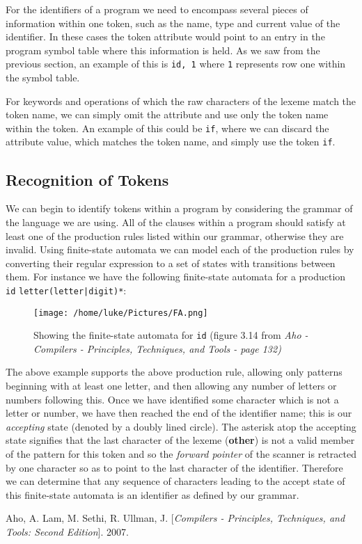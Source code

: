 \documentclass[a4paper, 11pt]{article}
\begin{document}
For the identifiers of a program we need to encompass several pieces of information within one token, such as the name, type and current value of the identifier. In these cases the token attribute would point to an entry in the program symbol table where this information is held. As we saw from the previous section, an example of this is \textlangle{}\texttt{id, 1}\textrangle{} where \texttt{1} represents row one within the symbol table.

For keywords and operations of which the raw characters of the lexeme match the token name, we can simply omit the attribute and use only the token name within the token. An example of this could be \texttt{if}, where we can discard the attribute value, which matches the token name, and simply use the token \textlangle{}\texttt{if}\textrangle{}.

\subsection{Recognition of Tokens}
We can begin to identify tokens within a program by considering the grammar of the language we are using. All of the clauses within a program should satisfy at least one of the production rules listed within our grammar, otherwise they are invalid. Using finite-state automata we can model each of the production rules by converting their regular expression to a set of states with transitions between them. For instance we have the following finite-state automata for a production \texttt{id} \textbf{\textrightarrow} \texttt{letter(letter|digit)*}:

\begin{figure}[ht!]
	\centering
	\texttt{[image: /home/luke/Pictures/FA.png]}
	\caption{Showing the finite-state automata for \texttt{id} (figure 3.14 from \textit{Aho - Compilers - Principles, Techniques, and Tools - page 132)} \label{overflow}}
\end{figure}

The above example supports the above production rule, allowing only patterns beginning with at least one letter, and then allowing any number of letters or numbers following this. Once we have identified some character which is not a letter or number, we have then reached the end of the identifier name; this is our \textit{accepting} state (denoted by a doubly lined circle). The asterisk atop the accepting state signifies that the last character of the lexeme (\textbf{other}) is not a valid member of the pattern for this token and so the \textit{forward pointer} of the scanner is retracted by one character so as to point to the last character of the identifier. Therefore we can determine that any sequence of characters leading to the accept state of this finite-state automata is an identifier as defined by our grammar.

\newpage
{}
\begin{thebibliography}{9}

Aho, A. Lam, M. Sethi, R. Ullman, J.
[\textit{Compilers - Principles, Techniques, and Tools: Second Edition}]. 
2007.


\end{thebibliography}
\end{document}
